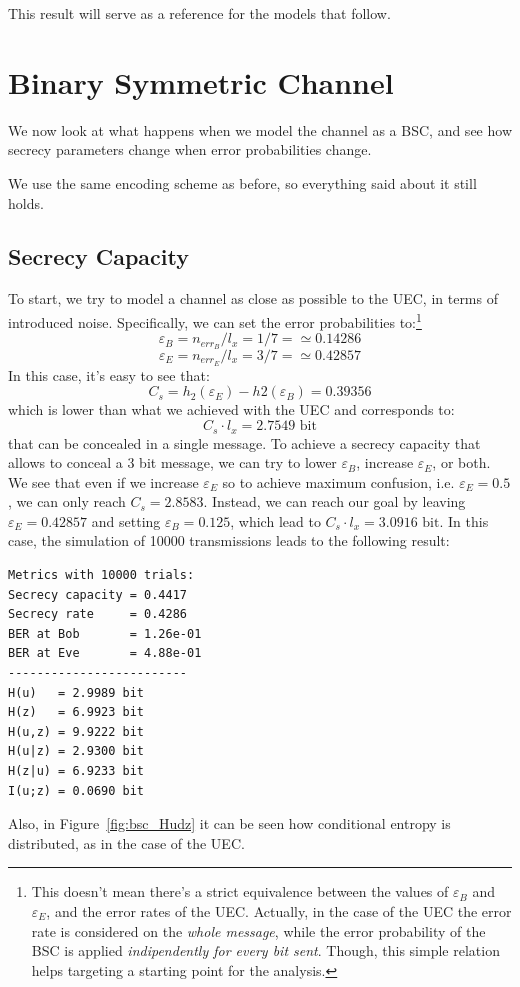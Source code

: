 \documentclass[a4paper,12pt,titlepage]{article}
\begin{document}
This result will serve as a reference for the models that follow.

\section{Binary Symmetric Channel}
We now look at what happens when we model the channel as a BSC, and see how
secrecy parameters change when error probabilities change.

We use the same encoding scheme as before, so everything said about it still
holds.

\subsection*{Secrecy Capacity}
To start, we try to model a channel as close as possible to the UEC, in terms
of introduced noise. Specifically, we can set the error probabilities
to:\footnote{This doesn't mean there's a strict equivalence
between the values of $\varepsilon_B$ and $\varepsilon_E$, and the error rates
of the UEC. Actually, in the case of the UEC the error rate is considered on
the \emph{whole message}, while the error probability of the BSC is applied
\emph{indipendently for every bit sent}. Though, this simple relation helps
targeting a starting point for the analysis.}
\[
  \varepsilon_B = n_{err_B}/l_x = 1/7 = \simeq 0.14286
\]
\[
  \varepsilon_E = n_{err_E}/l_x = 3/7 = \simeq 0.42857
\]
In this case, it's easy to see that:
\[
  C_s = h_2(\varepsilon_E) - h2(\varepsilon_B) = 0.39356
\]
which is lower than what we achieved with the UEC and corresponds to:
\[
  C_s \cdot l_x = 2.7549 \text{ bit}
\]
that can be concealed in a single message. To achieve a secrecy capacity that
allows to conceal a 3 bit message, we can try to lower $\varepsilon_B$, increase
$\varepsilon_E$, or both. We see that even if we increase $\varepsilon_E$ so to
achieve maximum confusion, i.e. $\varepsilon_E = 0.5$, we can only reach $C_s =
2.8583$. Instead, we can reach our goal by leaving $\varepsilon_E = 0.42857$
and setting $\varepsilon_B = 0.125$, which lead to $C_s \cdot l_x = 3.0916
\text{ bit}$. In this case, the simulation of 10000 transmissions leads to the
following result:
\begin{verbatim}
Metrics with 10000 trials:
Secrecy capacity = 0.4417
Secrecy rate     = 0.4286
BER at Bob       = 1.26e-01
BER at Eve       = 4.88e-01
-------------------------
H(u)   = 2.9989 bit
H(z)   = 6.9923 bit
H(u,z) = 9.9222 bit
H(u|z) = 2.9300 bit
H(z|u) = 6.9233 bit
I(u;z) = 0.0690 bit
\end{verbatim}
Also, in Figure~\ref{fig:bsc_Hudz} it can be seen how conditional entropy is
distributed, as in the case of the UEC.
\end{document}
